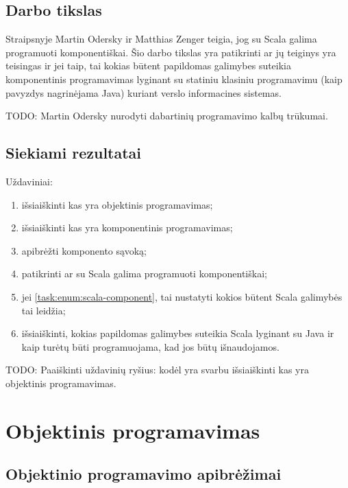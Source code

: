 \section{Darbo tikslas}

Straipsnyje \cite{scalable-component-abstractions} Martin Odersky
ir Matthias Zenger teigia, jog su Scala galima programuoti
komponentiškai. Šio darbo tikslas yra patikrinti ar jų teiginys yra
teisingas ir jei taip, tai kokias būtent papildomas galimybes
suteikia komponentinis programavimas lyginant su statiniu
klasiniu programavimu (kaip pavyzdys nagrinėjama Java) kuriant verslo
informacines sistemas.

TODO: Martin Odersky nurodyti dabartinių programavimo kalbų trūkumai.

\section{Siekiami rezultatai}

Uždaviniai:
\begin{enumerate}
  \item išsiaiškinti kas yra objektinis programavimas;
  \item išsiaiškinti kas yra komponentinis programavimas;
  \item apibrėžti komponento sąvoką;
  \item \label{task:enum:scala-component} patikrinti ar su Scala galima
    programuoti komponentiškai;
  \item jei \ref{task:enum:scala-component}, tai nustatyti kokios
    būtent Scala galimybės tai leidžia;
  \item išsiaiškinti, kokias papildomas galimybes suteikia Scala
    lyginant su Java ir kaip turėtų būti programuojama, kad jos
    būtų išnaudojamos.
\end{enumerate}

TODO: Paaiškinti uždavinių ryšius: kodėl yra svarbu išsiaiškinti kas
yra objektinis programavimas.

\chapter{Objektinis programavimas}

\section{Objektinio programavimo apibrėžimai}

